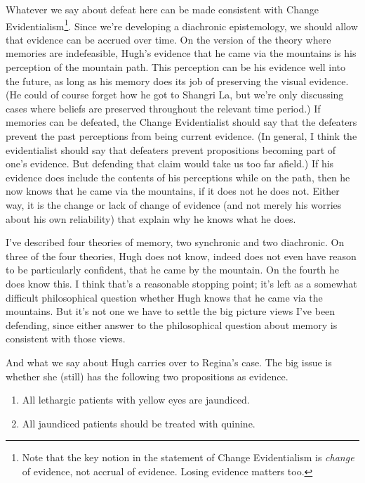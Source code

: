 \documentclass[
  10pt,
  letterpaper,
  twoside]{scrbook}
\providecommand{\tightlist}{%
  \setlength{\itemsep}{0pt}\setlength{\parskip}{0pt}}\usepackage{longtable,booktabs,array}
\begin{document}
Whatever we say about defeat here can be made consistent with Change
Evidentialism\footnote{Note that the key notion in the statement of
  Change Evidentialism is \emph{change} of evidence, not accrual of
  evidence. Losing evidence matters too.}. Since we're developing a
diachronic epistemology, we should allow that evidence can be accrued
over time. On the version of the theory where memories are indefeasible,
{Hugh}'s evidence that he came via the mountains is his perception of
the mountain path. This perception can be his evidence well into the
future, as long as his memory does its job of preserving the visual
evidence. (He could of course forget how he got to Shangri La, but we're
only discussing cases where beliefs are preserved throughout the
relevant time period.) If memories can be defeated, the Change
Evidentialist should say that the defeaters prevent the past perceptions
from being current evidence. (In general, I think the evidentialist
should say that defeaters prevent propositions becoming part of one's
evidence. But defending that claim would take us too far afield.) If his
evidence does include the contents of his perceptions while on the path,
then he now knows that he came via the mountains, if it does not he does
not. Either way, it is the change or lack of change of evidence (and not
merely his worries about his own reliability) that explain why he knows
what he does.

I've described four theories of memory, two synchronic and two
diachronic. On three of the four theories, {Hugh} does not know, indeed
does not even have reason to be particularly confident, that he came by
the mountain. On the fourth he does know this. I think that's a
reasonable stopping point; it's left as a somewhat difficult
philosophical question whether {Hugh} knows that he came via the
mountains. But it's not one we have to settle the big picture views I've
been defending, since either answer to the philosophical question about
memory is consistent with those views.

And what we say about {Hugh} carries over to {Regina}'s case. The big
issue is whether she (still) has the following two propositions as
evidence.

\begin{enumerate}
\def\labelenumi{\arabic{enumi}.}
\tightlist
\item
  All lethargic patients with yellow eyes are jaundiced.
\item
  All jaundiced patients should be treated with quinine.
\end{enumerate}
\end{document}
